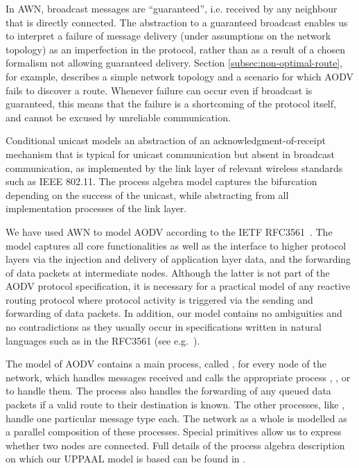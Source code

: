 \documentclass[conference,twoside]{IEEEtran}
\newcommand{\awn}{AWN\xspace}
\begin{document}
In AWN, broadcast messages are ``guaranteed'', i.e. received by any neighbour that is directly connected.
The abstraction to a guaranteed broadcast enables us to interpret a
failure of  message delivery (under assumptions on the
network topology) as an imperfection in the protocol, rather than as a
result of a chosen formalism not allowing guaranteed delivery. Section \ref{subsec:non-optimal-route}, for example, describes a simple network topology and a scenario for which AODV fails to discover a route. Whenever failure can occur even if broadcast is guaranteed, this means that the failure is a shortcoming of the protocol itself, and cannot be excused by unreliable communication.

Conditional unicast models an abstraction of an ac\-know\-ledg\-ment-of-receipt mechanism
that is typical for unicast communication but absent in broadcast communication, as implemented by
the link layer of relevant wireless standards such as IEEE 802.11. The
process algebra model captures
the bifurcation depending on the success of the unicast, while
  abstracting from all implementation processes of the link layer.

We have used \awn to model AODV according to the IETF RFC3561~\cite{rfc3561}.
The model captures all core functionalities as well as the interface to higher protocol layers via the injection
and delivery of application layer data,  and
the forwarding of data packets at intermediate nodes.
Although the latter is not part of the AODV protocol specification, it is necessary
for a practical model of any reactive routing protocol where protocol activity is triggered via the
sending and forwarding of data packets. In addition, our model contains no ambiguities and no contradictions as they usually
occur in specifications written in natural languages such as in the RFC3561 (see e.g.~\cite{TR11}).

The  model of AODV contains a main process, called {\AODV}, for every node of the network, which handles messages received
and calls the appropriate process {\PKT}, {\RREQ}, {\RREP} or
{\RERR} to handle them. The process also handles the forwarding of any queued data packets
if a valid route to their destination is known. The other processes, like {\RREQ}, handle one particular message type
each. The network as a whole is modelled as a parallel composition of these processes.
Special primitives allow us to express whether two nodes are connected.
Full details of the process algebra description on which our UPPAAL model is based can be found in \cite{TR11}.
\end{document}
